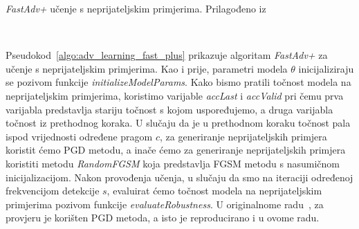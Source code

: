 \documentclass[times, utf8, zavrsni, numeric]{fer}
\begin{document}
\begin{algorithm}[t]
    \caption{\textit{FastAdv+} učenje s neprijateljskim primjerima. Prilagođeno iz~\cite{li2020towards}}
    \label{algo:adv_learning_fast_plus}
    \begin{algorithmic}
        \\\hrulefill
                \ELSE 
                \ENDIF
                \ENDIF 
            \ENDFOR
        \ENDFOR
    \end{algorithmic}
\end{algorithm}

Pseudokod~\ref{algo:adv_learning_fast_plus} prikazuje algoritam \textit{FastAdv+} za učenje s neprijateljskim primjerima.
Kao i prije, parametri modela $\theta$ inicijaliziraju se pozivom funkcije \textit{initializeModelParams}.
Kako bismo pratili točnost modela na neprijateljskim primjerima, koristimo varijable \textit{accLast} i \textit{accValid} 
pri čemu prva varijabla predstavlja stariju točnost s kojom uspoređujemo, a druga varijabla točnost iz prethodnog koraka.
U slučaju da je u prethodnom koraku točnost pala ispod vrijednosti određene pragom $c$, za generiranje neprijateljskih primjera koristit ćemo PGD metodu,
a inače ćemo za generiranje neprijateljskih primjera koristiti metodu \textit{RandomFGSM} koja predstavlja FGSM metodu s nasumičnom inicijalizacijom.
Nakon provođenja učenja, u slučaju da smo na iteraciji određenoj frekvencijom detekcije $s$, evaluirat ćemo točnost modela na neprijateljskim primjerima pozivom funkcije \textit{evaluateRobustness}.
U originalnome radu~\cite{li2020towards}, za provjeru je korišten PGD metoda, a isto je reproducirano i u ovome radu. 
\end{document}
